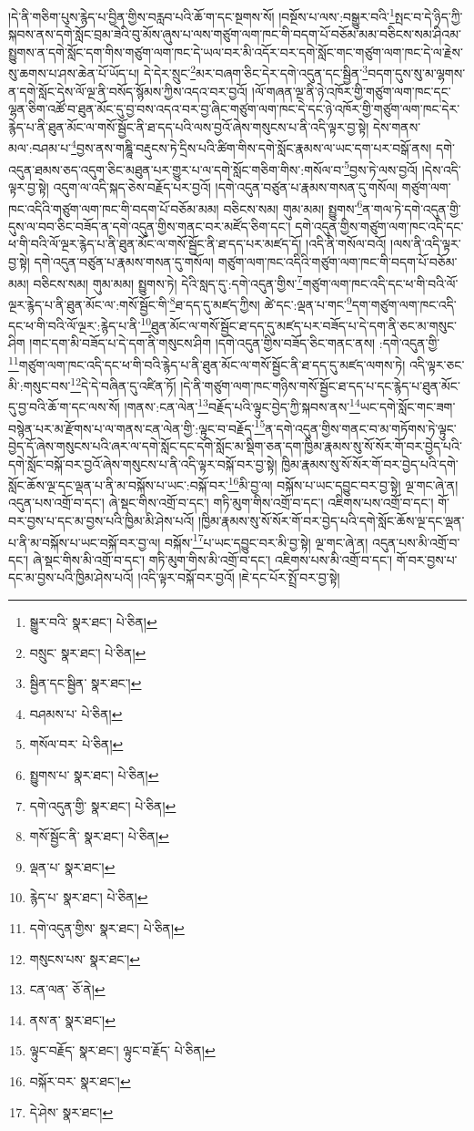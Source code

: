 །དེ་ནི་གཅིག་པུས་རྙེད་པ་བྱིན་གྱིས་བརླབ་པའི་ཆོ་ག་དང་སྔགས་སོ། །བསྔོས་པ་ལས་:བསྒྱུར་བའི་\footnote{སྒྱུར་བའི་  སྣར་ཐང་།  པེ་ཅིན། }སྤང་བ་དེ་ཉིད་ཀྱི་སྐབས་ནས་དགེ་སློང་བྲམ་ཟེའི་བུ་མོས་ཞུས་པ་ལས་གཙུག་ལག་ཁང་གི་བདག་པོ་བཅོམ་མམ་བཅིངས་སམ་ཤིའམ་སྤྱུགས་ན་དགེ་སློང་དག་གིས་གཙུག་ལག་ཁང་དེ་ཡལ་བར་མི་འདོར་བར་དགེ་སློང་གང་གཙུག་ལག་ཁང་དེ་ལ་རྗེས་སུ་ཆགས་པ་ཤས་ཆེན་པོ་ཡོད་པ། དེ་དེར་སྲུང་\footnote{བསྲུང་  སྣར་ཐང་།  པེ་ཅིན། }མར་བཞག་ཅིང་དེར་དགེ་འདུན་དང་སྦྱིན་\footnote{སྦྱིན་དང་སྦྱིན་  སྣར་ཐང་། }བདག་དུས་སུ་མ་ལྷགས་ན་དགེ་སློང་དེས་ལོ་ལྔ་ནི་བསོད་སྙོམས་ཀྱིས་འདའ་བར་བྱའོ། །ལོ་གཞན་ལྔ་ནི་ཉེ་འཁོར་གྱི་གཙུག་ལག་ཁང་དང་ལྷན་ཅིག་འཚོ་བ་ཐུན་མོང་དུ་བྱ་བས་འདའ་བར་བྱ་ཞིང་གཙུག་ལག་ཁང་དེ་དང་ཉེ་འཁོར་གྱི་གཙུག་ལག་ཁང་དེར་རྙེད་པ་ནི་ཐུན་མོང་ལ་གསོ་སྦྱོང་ནི་ཐ་དད་པའི་ལས་བྱའོ་ཞེས་གསུངས་པ་ནི་འདི་ལྟར་བྱ་སྟེ། དེས་གནས་མལ་:བཤམ་པ་\footnote{བཤམས་པ་  པེ་ཅིན། }བྱས་ནས་གཎྜཱི་བརྡུངས་ཏེ་དྲིས་པའི་ཚིག་གིས་དགེ་སློང་རྣམས་ལ་ཡང་དག་པར་བསྒོ་ནས། དགེ་འདུན་ཐམས་ཅད་འདུག་ཅིང་མཐུན་པར་གྱུར་པ་ལ་དགེ་སློང་གཅིག་གིས་:གསོལ་བ་\footnote{གསོལ་བར་  པེ་ཅིན། }བྱས་ཏེ་ལས་བྱའོ། །དེས་འདི་ལྟར་བྱ་སྟེ། འདུག་ལ་འདི་སྐད་ཅེས་བརྗོད་པར་བྱའོ། །དགེ་འདུན་བཙུན་པ་རྣམས་གསན་དུ་གསོལ། གཙུག་ལག་ཁང་འདིའི་གཙུག་ལག་ཁང་གི་བདག་པོ་བཅོམ་མམ། བཅིངས་སམ། གུམ་མམ། སྤྱུགས་\footnote{སྤྱུགས་པ་  སྣར་ཐང་།  པེ་ཅིན། }ན་གལ་ཏེ་དགེ་འདུན་གྱི་དུས་ལ་བབ་ཅིང་བཟོད་ན་དགེ་འདུན་གྱིས་གནང་བར་མཛོད་ཅིག་དང་། དགེ་འདུན་གྱིས་གཙུག་ལག་ཁང་འདི་དང་ཕ་གི་བའི་ལོ་ལྔར་རྙེད་པ་ནི་ཐུན་མོང་ལ་གསོ་སྦྱོང་ནི་ཐ་དད་པར་མཛད་དོ། །འདི་ནི་གསོལ་བའོ། །ལས་ནི་འདི་ལྟར་བྱ་སྟེ། དགེ་འདུན་བཙུན་པ་རྣམས་གསན་དུ་གསོལ། གཙུག་ལག་ཁང་འདིའི་གཙུག་ལག་ཁང་གི་བདག་པོ་བཅོམ་མམ། བཅིངས་སམ། གུམ་མམ། སྤྱུགས་ཏེ། དེའི་སླད་དུ་:དགེ་འདུན་གྱིས་\footnote{དགེ་འདུན་གྱི་  སྣར་ཐང་།  པེ་ཅིན། }གཙུག་ལག་ཁང་འདི་དང་ཕ་གི་བའི་ལོ་ལྔར་རྙེད་པ་ནི་ཐུན་མོང་ལ་:གསོ་སྦྱོང་གི་\footnote{གསོ་སྦྱོང་ནི་  སྣར་ཐང་།  པེ་ཅིན། }ཐ་དད་དུ་མཛད་ཀྱིས། ཚེ་དང་:ལྡན་པ་གང་\footnote{ལྡན་པ་  སྣར་ཐང་། }དག་གཙུག་ལག་ཁང་འདི་དང་ཕ་གི་བའི་ལོ་ལྔར་:རྙེད་པ་ནི་\footnote{རྙེད་པ་  སྣར་ཐང་།  པེ་ཅིན། }ཐུན་མོང་ལ་གསོ་སྦྱོང་ཐ་དད་དུ་མཛད་པར་བཟོད་པ་དེ་དག་ནི་ཅང་མ་གསུང་ཤིག །གང་དག་མི་བཟོད་པ་དེ་དག་ནི་གསུངས་ཤིག །དགེ་འདུན་གྱིས་བཟོད་ཅིང་གནང་ནས། :དགེ་འདུན་གྱི་\footnote{དགེ་འདུན་གྱིས་  སྣར་ཐང་།  པེ་ཅིན། }གཙུག་ལག་ཁང་འདི་དང་ཕ་གི་བའི་རྙེད་པ་ནི་ཐུན་མོང་ལ་གསོ་སྦྱོང་ནི་ཐ་དད་དུ་མཛད་ལགས་ཏེ། འདི་ལྟར་ཅང་མི་:གསུང་བས་\footnote{གསུངས་པས་  སྣར་ཐང་། }དེ་དེ་བཞིན་དུ་འཛིན་ཏོ། །དེ་ནི་གཙུག་ལག་ཁང་གཉིས་གསོ་སྦྱོང་ཐ་དད་པ་དང་རྙེད་པ་ཐུན་མོང་དུ་བྱ་བའི་ཆོ་ག་དང་ལས་སོ། །གནས་:ངན་ལེན་\footnote{ངན་ལན་  ཅོ་ནེ། }བརྗོད་པའི་ལྟུང་བྱེད་ཀྱི་སྐབས་ནས་\footnote{ནས་ན་  སྣར་ཐང་། }ཡང་དགེ་སློང་གང་ཟག་བསྙེན་པར་མ་རྫོགས་པ་ལ་གནས་ངན་ལེན་གྱི་:ལྟུང་བ་བརྗོད་\footnote{ལྟུང་བརྗོད་  སྣར་ཐང་། ལྟུང་བ་རྗོད་  པེ་ཅིན། }ན་དགེ་འདུན་གྱིས་གནང་བ་མ་གཏོགས་ཏེ་ལྟུང་བྱེད་དོ་ཞེས་གསུངས་པའི་ཞར་ལ་དགེ་སློང་དང་དགེ་སློང་མ་སྡིག་ཅན་དག་ཁྱིམ་རྣམས་སུ་སོ་སོར་གོ་བར་བྱེད་པའི་དགེ་སློང་བསྐོ་བར་བྱའོ་ཞེས་གསུངས་པ་ནི་འདི་ལྟར་བསྐོ་བར་བྱ་སྟེ། ཁྱིམ་རྣམས་སུ་སོ་སོར་གོ་བར་བྱེད་པའི་དགེ་སློང་ཆོས་ལྔ་དང་ལྡན་པ་ནི་མ་བསྐོས་པ་ཡང་:བསྐོ་བར་\footnote{བསྐོར་བར་  སྣར་ཐང་། }མི་བྱ་ལ། བསྐོས་པ་ཡང་དབྱུང་བར་བྱ་སྟེ། ལྔ་གང་ཞེ་ན། འདུན་པས་འགྲོ་བ་དང་། ཞེ་སྡང་གིས་འགྲོ་བ་དང་། གཏི་མུག་གིས་འགྲོ་བ་དང་། འཇིགས་པས་འགྲོ་བ་དང་། གོ་བར་བྱས་པ་དང་མ་བྱས་པའི་ཁྱིམ་མི་ཤེས་པའོ། །ཁྱིམ་རྣམས་སུ་སོ་སོར་གོ་བར་བྱེད་པའི་དགེ་སློང་ཆོས་ལྔ་དང་ལྡན་པ་ནི་མ་བསྐོས་པ་ཡང་བསྐོ་བར་བྱ་ལ། བསྐོས་\footnote{དེ་ཤེས་  སྣར་ཐང་། }པ་ཡང་དབྱུང་བར་མི་བྱ་སྟེ། ལྔ་གང་ཞེ་ན། འདུན་པས་མི་འགྲོ་བ་དང་། ཞེ་སྡང་གིས་མི་འགྲོ་བ་དང་། གཏི་མུག་གིས་མི་འགྲོ་བ་དང་། འཇིགས་པས་མི་འགྲོ་བ་དང་། གོ་བར་བྱས་པ་དང་མ་བྱས་པའི་ཁྱིམ་ཤེས་པའོ། །འདི་ལྟར་བསྐོ་བར་བྱའོ། །ཇེ་དང་པོར་སྤྲོ་བར་བྱ་སྟེ། 